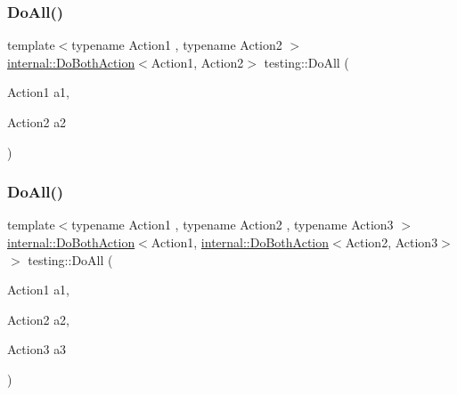 \subsubsection{\texorpdfstring{DoAll()}{DoAll()}\hspace{0.1cm}{\footnotesize\ttfamily [1/9]}}
{\footnotesize\ttfamily template$<$typename Action1 , typename Action2 $>$ \\
\mbox{\hyperlink{classtesting_1_1internal_1_1DoBothAction}{internal\+::\+Do\+Both\+Action}}$<$Action1, Action2$>$ testing\+::\+Do\+All (\begin{DoxyParamCaption}\item[{Action1}]{a1,  }\item[{Action2}]{a2 }\end{DoxyParamCaption})\hspace{0.3cm}{\ttfamily [inline]}}

\mbox{\label{namespacetesting_ad6a3ce5e229120ea287286a86394d712}} 
\subsubsection{\texorpdfstring{DoAll()}{DoAll()}\hspace{0.1cm}{\footnotesize\ttfamily [2/9]}}
{\footnotesize\ttfamily template$<$typename Action1 , typename Action2 , typename Action3 $>$ \\
\mbox{\hyperlink{classtesting_1_1internal_1_1DoBothAction}{internal\+::\+Do\+Both\+Action}}$<$Action1, \mbox{\hyperlink{classtesting_1_1internal_1_1DoBothAction}{internal\+::\+Do\+Both\+Action}}$<$Action2, Action3$>$ $>$ testing\+::\+Do\+All (\begin{DoxyParamCaption}\item[{Action1}]{a1,  }\item[{Action2}]{a2,  }\item[{Action3}]{a3 }\end{DoxyParamCaption})\hspace{0.3cm}{\ttfamily [inline]}}

\mbox{\label{namespacetesting_a790ce08c80a1f8ececa0f2a4f678247c}} 
